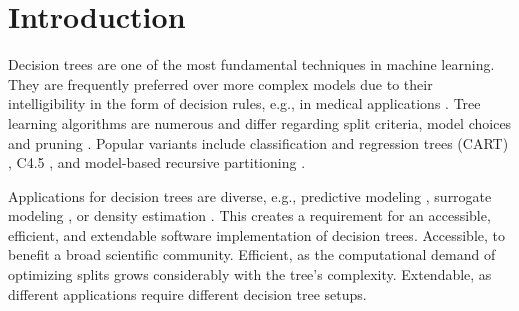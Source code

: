 \documentclass[a4paper, 11pt]{article}
\begin{document}
\section{Introduction}

Decision trees are one of the most fundamental techniques in machine learning. They are frequently preferred over more complex models due to their intelligibility in the form of decision rules, e.g., in medical applications \cite{podgorelec_trees_medicine}. Tree learning algorithms are numerous and differ regarding split criteria, model choices and pruning \cite{loh_trees_review}. Popular variants include classification and regression trees (CART) \cite{cart_1}, C4.5 \cite{quinlan_c45}, and model-based recursive partitioning \cite{zeileis_mob}.
\par

\par
Applications for decision trees are diverse, e.g., predictive modeling \cite{hastie_elemstatlearn}, surrogate modeling \cite{schaaf_surrogate_tree}, or density estimation \cite{ram_density_estimation_tree}. This creates a requirement for an accessible, efficient, and extendable software implementation of decision trees. Accessible, to benefit a broad scientific community. Efficient, as the computational demand of optimizing splits grows considerably with the tree's complexity. Extendable, as different applications require different decision tree setups.
\par
\end{document}
